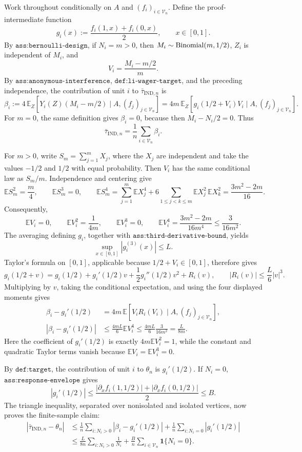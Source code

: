 Work throughout conditionally on \(A\) and \((f_i)_{i\in\mathcal V_n}\).  Define the proof-intermediate function
\[
g_i(x):=\frac{f_i(1,x)+f_i(0,x)}{2},\qquad x\in[0,1].
\]
By \(\texttt{ass:bernoulli-design}\), if \(N_i=m>0\), then \(M_i\sim {\rm Binomial}(m,1/2)\), \(Z_i\) is independent of \(M_i\), and
\[
V_i=\frac{M_i-m/2}{m}.
\]
By \(\texttt{ass:anonymous-interference}\), \(\texttt{def:li-wager-target}\), and the preceding independence, the contribution of unit \(i\) to \(\bar\tau_{\mathrm{IND},n}\) is
\[
\beta_i
:=4\,\mathbb E_Z\!\left[Y_i(Z)(M_i-m/2)\mid A,(f_j)_{j\in\mathcal V_n}\right]
=4m\,\mathbb E_Z\!\left[g_i(1/2+V_i)V_i\mid A,(f_j)_{j\in\mathcal V_n}\right].
\]
For \(m=0\), the same definition gives \(\beta_i=0\), because then \(M_i-N_i/2=0\).  Thus
\[
\bar\tau_{\mathrm{IND},n}=\frac1n\sum_{i\in\mathcal V_n}\beta_i.
\]

For \(m>0\), write \(S_m=\sum_{j=1}^m X_j\), where the \(X_j\) are independent and take the values \(-1/2\) and \(1/2\) with equal probability.  Then \(V_i\) has the same conditional law as \(S_m/m\).  Independence and centering give
\[
\mathbb E S_m^2=\frac m4,\qquad
\mathbb E S_m^3=0,\qquad
\mathbb E S_m^4
=\sum_{j=1}^m\mathbb E X_j^4
+6\sum_{1\le j<k\le m}\mathbb E X_j^2\,\mathbb E X_k^2
=\frac{3m^2-2m}{16}.
\]
Consequently,
\[
\mathbb E V_i=0,\qquad
\mathbb E V_i^2=\frac1{4m},\qquad
\mathbb E V_i^3=0,\qquad
\mathbb E V_i^4=\frac{3m^2-2m}{16m^4}\le \frac{3}{16m^2}.
\]
The averaging defining \(g_i\), together with \(\texttt{ass:third-derivative-bound}\), yields
\[
\sup_{x\in[0,1]}|g_i^{(3)}(x)|\le L.
\]
Taylor's formula on \([0,1]\), applicable because \(1/2+V_i\in[0,1]\), therefore gives
\[
g_i(1/2+v)
=g_i(1/2)+g_i'(1/2)v+\frac12g_i''(1/2)v^2+R_i(v),
\qquad |R_i(v)|\le\frac L6|v|^3.
\]
Multiplying by \(v\), taking the conditional expectation, and using the four displayed moments gives
\[
\begin{aligned}
\beta_i-g_i'(1/2)
&=4m\,\mathbb E\!\left[V_iR_i(V_i)\mid A,(f_j)_{j\in\mathcal V_n}\right],\\
|\beta_i-g_i'(1/2)|
&\le \frac{4mL}{6}\mathbb E V_i^4
\le \frac{4mL}{6}\frac{3}{16m^2}
=\frac{L}{8m}.
\end{aligned}
\]
Here the coefficient of \(g_i'(1/2)\) is exactly \(4m\mathbb E V_i^2=1\), while the constant and quadratic Taylor terms vanish because \(\mathbb E V_i=\mathbb E V_i^3=0\).

By \(\texttt{def:target}\), the contribution of unit \(i\) to \(\theta_n\) is \(g_i'(1/2)\).  If \(N_i=0\), \(\texttt{ass:response-envelope}\) gives
\[
|g_i'(1/2)|
\le \frac{|\partial_x f_i(1,1/2)|+|\partial_x f_i(0,1/2)|}{2}
\le B.
\]
The triangle inequality, separated over nonisolated and isolated vertices, now proves the finite-sample claim:
\[
\begin{aligned}
|\bar\tau_{\mathrm{IND},n}-\theta_n|
&\le \frac1n\sum_{i:N_i>0}|\beta_i-g_i'(1/2)|
+\frac1n\sum_{i:N_i=0}|g_i'(1/2)|\\
&\le \frac{L}{8n}\sum_{i:N_i>0}\frac1{N_i}
+\frac Bn\sum_{i\in\mathcal V_n}\mathbf 1\{N_i=0\}.
\end{aligned}
\]

